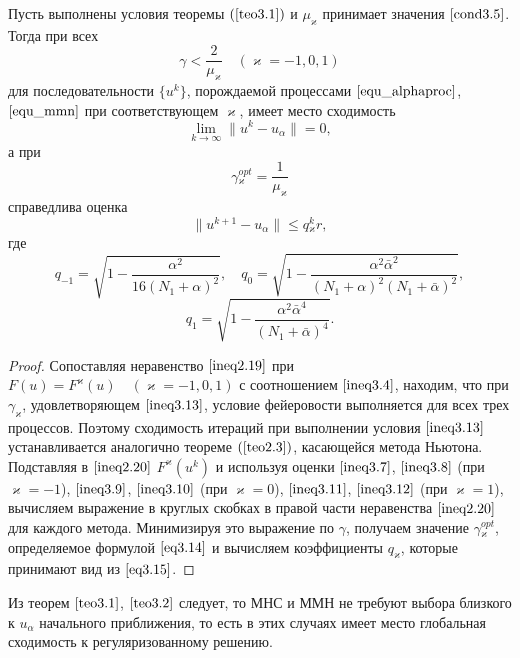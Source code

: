 \begin{theorem}\label{teo3.2}
	Пусть выполнены условия теоремы $(\ref{teo3.1})$ и $\mu_\varkappa$ принимает значения $\eqref{cond3.5}$. Тогда при всех
	\begin{equation}\label{ineq3.13}
	\gamma <\frac{2}{\mu _\varkappa}\quad (\varkappa=-1,0,1)
	\end{equation}
	для последовательности $\{u^k\}$, порождаемой процессами $\eqref{equ_alphaproc}$, $\eqref{equ_mmn}$ при соответствующем $\varkappa$, имеет место сходимость $$\lim_{k\to\infty}\|u^k-u_\alpha\|=0,$$ а при 
	\begin{equation}\label{eq3.14}
	\gamma{_\varkappa^{opt}}=\frac{1}{\mu_\varkappa}
	\end{equation}
	справедлива оценка $$\|u^{k+1}-u_\alpha\|\le q{_\varkappa^k}r,$$ где
	$$q_{-1}=\sqrt{1-\frac{\alpha^2}{16(N_1+\alpha)^2}}, \quad q_0=\sqrt{1-\frac{\alpha^2\bar\alpha^2}{(N_1+\alpha)^2(N_1+\bar\alpha)^2}},$$
	\begin{equation}\label{eq3.15}
	q_1=\sqrt{1-\frac{\alpha^2\bar\alpha^4}{(N_1+\bar\alpha)^4}}.
	\end{equation}
\end{theorem}
\begin{proof} Сопоставляя неравенство $\eqref{ineq2.19}$ при $F(u)=F^\varkappa(u) \quad (\varkappa=-1,0,1)$ с соотношением $\eqref{ineq3.4}$, находим, что при $\gamma_\varkappa$, удовлетворяющем  $\eqref{ineq3.13}$, условие фейеровости выполняется для всех трех процессов. Поэтому сходимость итераций при выполнении условия $\eqref{ineq3.13}$ устанавливается аналогично теореме $(\ref{teo2.3})$, касающейся метода Ньютона. Подставляя в $\eqref{ineq2.20}$ $F^\varkappa(u^k)$ и используя оценки $\eqref{ineq3.7}$, $\eqref{ineq3.8}$ (при $\varkappa=-1$), $\eqref{ineq3.9}$, $\eqref{ineq3.10}$ (при $\varkappa=0$), $\eqref{ineq3.11}$, $\eqref{ineq3.12}$ (при $\varkappa=1$), вычисляем выражение в круглых скобках в правой части неравенства $\eqref{ineq2.20}$ для каждого метода. Минимизируя это выражение по $\gamma$, получаем значение $\gamma{_\varkappa^{opt}}$, определяемое формулой $\eqref{eq3.14}$ и вычисляем коэффициенты $q_\varkappa$, которые принимают вид из $\eqref{eq3.15}$.
\end{proof}

\begin{remark}
	Из теорем $\eqref{teo3.1}$, $\eqref{teo3.2}$ следует, то МНС и ММН не требуют выбора близкого к $u_\alpha$ начального приближения, то есть в этих случаях имеет место глобальная сходимость к регуляризованному решению.
\end{remark}

